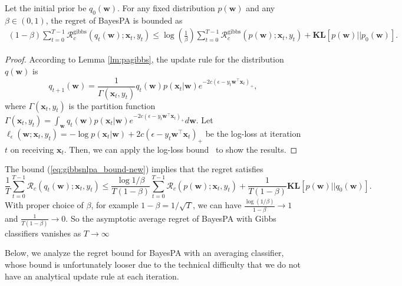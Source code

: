 \documentclass[twoside,11pt]{article}
\newcommand{\xv}{\bm{x}}
\newcommand{\regret}{\mathcal{R}}
\newcommand{\wv}{\bm{w}}
\newcommand{\KL}{\textbf{KL}}
\begin{document}
{\begin{theorem}\label{tm:gibbs-new}
Let the initial prior be $q_0(\wv)$. For any fixed distribution $p(\wv)$ and any $\beta \in (0,1)$, the regret of BayesPA is bounded as
\textnormal{ \setlength\arraycolsep{1pt} \begin{eqnarray} \label{eq:gibbsnlpa_bound-new}
(1-\beta) \sum\limits_{t=0}^{T-1}{\regret_c^\text{gibbs}(q_t(\wv); \xv_t, y_t)} \leq \log (\frac{1}{\beta}) \sum\limits_{t=0}^{T-1}{\regret_c^\text{gibbs}(p(\wv); \xv_t, y_t)}+\KL[p(\wv)||p_0(\wv)].  \end{eqnarray}}
\end{theorem}
\begin{proof}
According to Lemma \ref{lm:pagibbs}, the update rule for the distribution $q(\wv)$ is
\begin{equation*}
q_{t+1}(\wv) = \frac{1}{\Gamma(\xv_t, y_t)} q_t(\wv) p(\xv_t | \wv) e^{-2c \left(\epsilon-y_t \wv^\top \xv_t\right)_{+}},
\end{equation*}
where $\Gamma(\xv_t, y_t)$ is the partition function
$\Gamma(\xv_t, y_t) = \int_{\wv}{q_{t}(\wv) p(\xv_t | \wv)e^{-2 c \left(\epsilon-y_t \wv^\top \xv_t\right)_{+}} d \wv}$.
Let $\ell_\epsilon(\wv; \xv_t, y_t) = -\log p(\xv_t | \wv) + 2c \left(\epsilon-y_t \wv^\top \xv_t\right)_{+}$ be the log-loss at iteration $t$ on receiving $\xv_t$. Then, we can apply the log-loss bound~\citep[Theorem 3]{bayes-bounds} to show the results.
\end{proof}\vspace{-.5cm}
\begin{remark}
The bound (\ref{eq:gibbsnlpa_bound-new}) implies that the regret satisfies $$\frac{1}{T} \sum_{t=0}^{T-1}{\regret_c(q_t(\wv); \xv_t, y_t)} \leq  \frac{\log 1/ \beta}{T(1-\beta)}\sum_{t=0}^{T-1}{\regret_c(p(\wv); \xv_t, y_t)} + \frac{1}{T (1-\beta)} \KL[p(\wv) || q_0(\wv)].$$
With proper choice of $\beta$, for example $1-\beta = 1/\sqrt{T}$, we can have $\frac{\log(1/\beta)}{1-\beta} \rightarrow 1$ and $\frac{1}{T(1-\beta)} \rightarrow 0$. So the asymptotic average regret of BayesPA with Gibbs classifiers vanishes as $T \rightarrow \infty$
\end{remark}

Below, we analyze the regret bound for BayesPA with an averaging classifier, whose bound is unfortunately looser due to the technical difficulty that we do not have an analytical update rule at each iteration.

}
\end{document}
